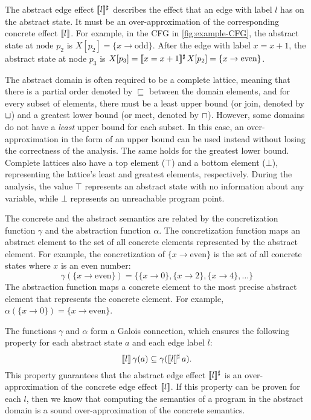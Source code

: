The abstract edge effect $\llbracket l\rrbracket^\sharp$ describes the effect that an edge with label $l$ has on the abstract state.
It must be an over-approximation of the corresponding concrete effect $\llbracket l\rrbracket$.
For example, in the CFG in \cref{fig:example-CFG}, the abstract state at node $p_2$ is $X[p_2] = \{x \rightarrow \text{odd}\}$.
After the edge with label $x = x+1$, the abstract state at node $p_3$ is $X[p_3] = \llbracket x = x+1\rrbracket^\sharp\,X[p_2] = \{x \rightarrow \text{even}\}$.

The abstract domain is often required to be a complete lattice, meaning that there is a partial order denoted by $\sqsubseteq$ between the domain elements, and for every subset of elements, there must be a least upper bound (or join, denoted by $\sqcup$) and a greatest lower bound (or meet, denoted by $\sqcap$).
However, some domains do not have a \emph{least} upper bound for each subset.
In this case, an over-approximation in the form of an upper bound can be used instead without losing the correctness of the analysis.
The same holds for the greatest lower bound.
Complete lattices also have a top element ($\top$) and a bottom element ($\bot$), representing the lattice's least and greatest elements, respectively.
During the analysis, the value $\top$ represents an abstract state with no information about any variable, while $\bot$ represents an unreachable program point.

The concrete and the abstract semantics are related by the concretization function $\gamma$ and the abstraction function $\alpha$.
The concretization function maps an abstract element to the set of all concrete elements represented by the abstract element.
For example, the concretization of $\{x \rightarrow \text{even}\}$ is the set of all concrete states where $x$ is an even number:
\[
  \gamma(\{x \rightarrow \text{even}\}) = \{\{x \rightarrow 0\}, \{x \rightarrow 2\}, \{x \rightarrow 4\},\ldots\}
\]
The abstraction function maps a concrete element to the most precise abstract element that represents the concrete element. For example, $\alpha(\{x \rightarrow 0\}) = \{x \rightarrow \text{even}\}$.

The functions $\gamma$ and $\alpha$ form a Galois connection, which ensures the following property for each abstract state $a$ and each edge label $l$:
\[
  \llbracket l\rrbracket\,\gamma(a) \subseteq \gamma(\llbracket l\rrbracket^\sharp\,a).
\]
This property guarantees that the abstract edge effect $\llbracket l\rrbracket^\sharp$ is an over-approximation
of the concrete edge effect $\llbracket l\rrbracket$.
If this property can be proven for each $l$, then we know that computing the semantics of a program in the abstract domain is a sound over-approximation of the concrete semantics.


